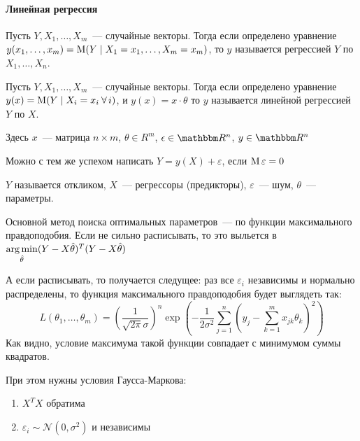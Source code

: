 \documentclass[12pt,timbord]{../../../notes}
\begin{document}
\paragraph{Линейная регрессия}
\label{par:stat::regr}


\begin{defn}[Регрессия]\label{defn:stat::regr::reg}
  Пусть $Y, X_1, \dotsc, X_m$~--- случайные векторы. 
  Тогда если определено уравнение $y(x_1, \dotsc, x_m) = \operatorname{M} (Y \mid X_1 = x_1, \dotsc, X_m =
  x_m)$,  то $y$ называется регрессией $Y$ по $X_1, \dotsc, X_n$.
\end{defn}

\begin{defn}\label{defn:stat::regr::lin}
  Пусть $Y, X_1, \dotsc, X_m$~--- случайные векторы. 
  Тогда если определено уравнение $y(x) = \operatorname{M} (Y \mid X_i =  x_i \:\forall\, i)$, 
  и $y(x) = x\cdot\theta $ то $y$ называется линейной регрессией $Y$ по $X$.

  Здесь $x$~--- матрица $n\times m$, $\theta\in R^m$, $\epsilon\in \R^n$, $y\in \R^n$
\end{defn}
\begin{rem}\label{rem:stat::regr::funran}
  Можно с тем же успехом написать $Y = y(X)+ \varepsilon$, если $\operatorname{M} \varepsilon =0$
\end{rem}

\begin{defn}\label{defn:stat::reg::memb}
  $Y$ называется откликом, $X$~--- регрессоры (предикторы), $\varepsilon$~--- шум, $\theta$~---
  параметры.
\end{defn}

Основной метод поиска оптимальных параметров~--- по  функции максимального правдоподобия.
Если не
сильно расписывать, то это выльется в $\operatorname*{arg\,min}\limits_{\hat\theta} (Y-X\hat\theta)^T(Y-X\hat\theta)$

\begin{itaux}
  А если расписывать, то получается следущее: раз все $\varepsilon_i$ независимы и нормально
  распределены, то функция максимального правдоподобия  будет выглядеть так:\[
    L(\theta_1, \dotsc, \theta_m) = \left( \frac{1}{\sqrt{2\pi} \sigma} \right)^n
    \exp \left(
      -\frac{1}{2\sigma^2}\sum_{j=1}^n\left(y_j-\textstyle\sum_{k=1}^m x_{jk}\theta_k \right)^2
    \right)
  \]
  Как видно, условие максимума такой функции совпадает с минимумом суммы квадратов.
\end{itaux}

При этом нужны условия Гаусса-Маркова:
\begin{enumerate}
  \item $X^TX$ обратима
  \item $\varepsilon_i \sim \mathcal N(0,\sigma^2)$ и независимы
\end{enumerate}
\end{document}
